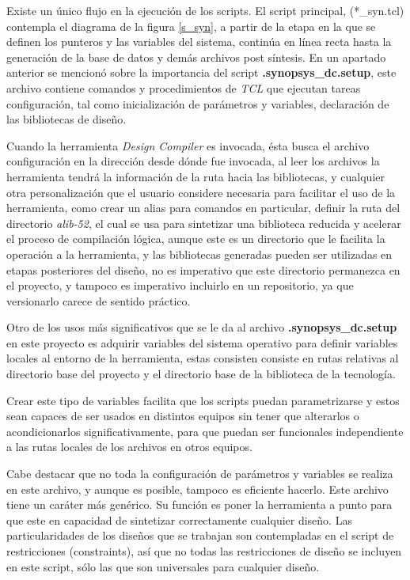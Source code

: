 Existe un único flujo en la ejecución de los scripts. El script principal, (*\_syn.tcl) contempla el diagrama de la figura \ref{s_syn}, a partir de la etapa en la que se definen los punteros y las variables del sistema, continúa en línea recta hasta la generación de la base de datos y demás archivos post síntesis. En un apartado anterior se mencionó sobre la importancia del script \textbf{.synopsys\_dc.setup}, este archivo contiene comandos y procedimientos de \textit{TCL} que ejecutan tareas configuración, tal como inicialización de parámetros y variables, declaración de las bibliotecas de diseño.

Cuando la herramienta \textit{Design Compiler} es invocada, ésta busca el archivo configuración en la dirección desde dónde fue invocada, al leer los archivos la herramienta tendrá la información de la ruta hacia las bibliotecas, y cualquier otra personalización que el usuario considere necesaria para facilitar el uso de la herramienta, como crear un alias para comandos en particular, definir la ruta del directorio \textit{alib-52}, el cual se usa para sintetizar una biblioteca reducida y acelerar el proceso de compilación lógica, aunque este es un directorio que le facilita la operación a la herramienta, y las bibliotecas generadas pueden ser utilizadas en etapas posteriores del diseño, no es imperativo que este directorio permanezca en el proyecto, y tampoco es imperativo incluirlo en un repositorio, ya que versionarlo carece de sentido práctico.

Otro de los usos más significativos que se le da al archivo \textbf{.synopsys\_dc.setup} en este proyecto es adquirir variables del sistema operativo para definir variables locales al entorno de la herramienta, estas consisten consiste en rutas relativas al directorio base del proyecto y el directorio base de la biblioteca de la tecnología.

Crear este tipo de variables facilita que los scripts puedan parametrizarse y estos sean capaces de ser usados en distintos equipos sin tener que alterarlos o acondicionarlos significativamente, para que puedan ser funcionales independiente a las rutas locales de los archivos en otros equipos.

Cabe destacar que no toda la configuración de parámetros y variables se realiza en este archivo, y aunque es posible, tampoco es eficiente hacerlo. Este archivo tiene un caráter más genérico. Su función es poner la herramienta a punto para que este en capacidad de sintetizar correctamente cualquier diseño. Las particularidades de los diseños que se trabajan son contempladas en el script de restricciones (constraints), así que no todas las restricciones de diseño se incluyen en este script, sólo las que son universales para cualquier diseño. 

